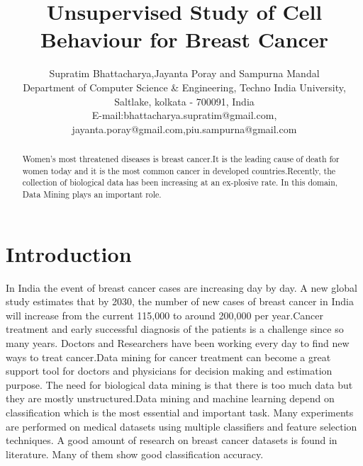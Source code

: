 \documentclass[11pt]{article}
\begin{document}

\pagestyle{plain}

\title{Unsupervised Study of Cell Behaviour for Breast Cancer}

\author{Supratim Bhattacharya,Jayanta Poray and Sampurna Mandal \\
Department of Computer Science \& Engineering, Techno India University,\\Saltlake, kolkata - 700091, India\\
E-mail:bhattacharya.supratim@gmail.com, jayanta.poray@gmail.com,piu.sampurna@gmail.com}

\maketitle

\begin{abstract}
Women's most threatened diseases is breast cancer.It is the leading cause of death for women today and it is the most common cancer in developed countries.Recently, the collection of biological data has been increasing at an ex-plosive rate. In this domain, Data Mining plays an important role.

\end{abstract}

\section{Introduction}
In India the event of breast cancer cases are increasing day by day. A new global study estimates that by 2030, the number of new cases of breast cancer in India will increase from the current 115,000 to around 200,000 per year.Cancer treatment and early successful diagnosis of the patients is a challenge since so many years. Doctors and Researchers have been working every day to find new ways to treat cancer.Data mining for cancer treatment can become a great support tool for doctors and physicians for decision making and estimation purpose. The need for biological data mining is that there is too much data but they are mostly unstructured.Data mining and machine learning depend on classification which is the most essential and important task. Many experiments are performed on medical datasets using multiple classifiers and feature selection techniques. A good amount of research on breast cancer datasets is found in literature. Many of them show good classification accuracy.
\end{document}
